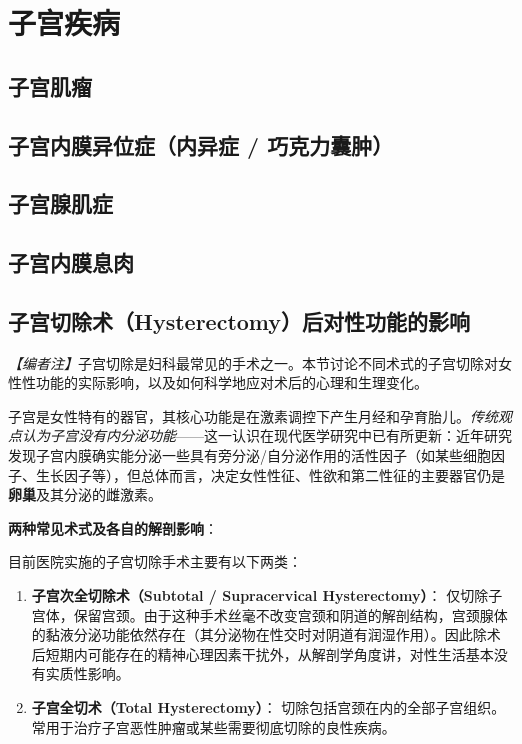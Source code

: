 \section{子宫疾病}
\subsection{子宫肌瘤}
\subsection{子宫内膜异位症（内异症 / 巧克力囊肿）}
\subsection{子宫腺肌症}
\subsection{子宫内膜息肉}
\subsection{子宫切除术（Hysterectomy）后对性功能的影响}

\noindent\textit{【编者注】}子宫切除是妇科最常见的手术之一。本节讨论不同术式的子宫切除对女性性功能的实际影响，以及如何科学地应对术后的心理和生理变化。

\vspace{0.5em}
子宫是女性特有的器官，其核心功能是在激素调控下产生月经和孕育胎儿。\textit{传统观点认为子宫没有内分泌功能}——这一认识在现代医学研究中已有所更新：近年研究发现子宫内膜确实能分泌一些具有旁分泌/自分泌作用的活性因子（如某些细胞因子、生长因子等），但总体而言，决定女性性征、性欲和第二性征的主要器官仍是\textbf{卵巢}及其分泌的雌激素。

\vspace{0.5em}
\noindent\textbf{两种常见术式及各自的解剖影响}：

目前医院实施的子宫切除手术主要有以下两类：

\begin{enumerate}
	\item \textbf{子宫次全切除术（Subtotal / Supracervical Hysterectomy）}：
	仅切除子宫体，保留宫颈。由于这种手术丝毫不改变宫颈和阴道的解剖结构，宫颈腺体的黏液分泌功能依然存在（其分泌物在性交时对阴道有润湿作用）。因此除术后短期内可能存在的精神心理因素干扰外，从解剖学角度讲，对性生活基本没有实质性影响。

	\item \textbf{子宫全切术（Total Hysterectomy）}：
	切除包括宫颈在内的全部子宫组织。常用于治疗子宫恶性肿瘤或某些需要彻底切除的良性疾病。
\end{enumerate}


